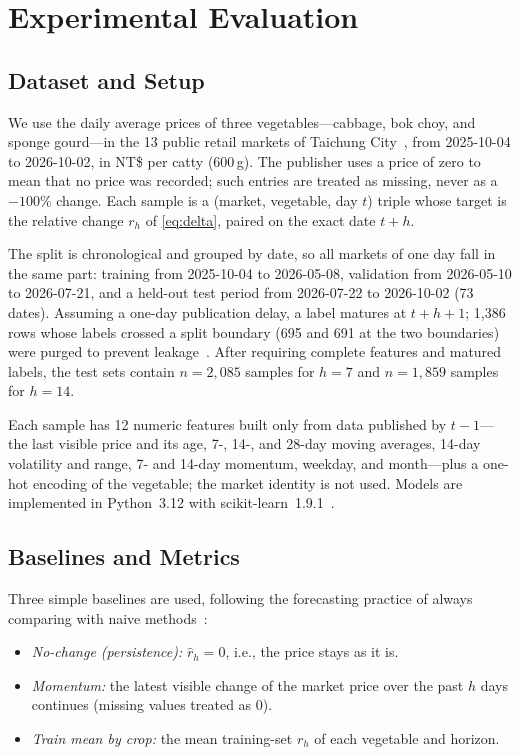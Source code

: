\section{Experimental Evaluation}\label{sec:experiments}

\subsection{Dataset and Setup}
We use the daily average prices of three vegetables---cabbage, bok choy, and
sponge gourd---in the 13 public retail markets of Taichung
City~\cite{taichung2026retail}, from 2025-10-04 to 2026-10-02, in NT\$ per
catty (600\,g). The publisher uses a price of zero to mean that no price was
recorded; such entries are treated as missing, never as a $-100\%$ change.
Each sample is a (market, vegetable, day $t$) triple whose target is the
relative change $r_h$ of \eqref{eq:delta}, paired on the exact date $t+h$.

The split is chronological and grouped by date, so all markets of one day fall
in the same part: training from 2025-10-04 to 2026-05-08, validation from
2026-05-10 to 2026-07-21, and a held-out test period from 2026-07-22 to
2026-10-02 (73 dates). Assuming a one-day publication delay, a label matures at
$t+h+1$; 1{,}386 rows whose labels crossed a split boundary (695 and 691 at the
two boundaries) were purged to prevent leakage~\cite{kaufman2012leakage}. After
requiring complete features and matured labels, the test sets contain
$n=2{,}085$ samples for $h=7$ and $n=1{,}859$ samples for $h=14$.

Each sample has 12 numeric features built only from data published by
$t-1$---the last visible price and its age, 7-, 14-, and 28-day moving
averages, 14-day volatility and range, 7- and 14-day momentum, weekday, and
month---plus a one-hot encoding of the vegetable; the market identity is not
used. Models are implemented in Python~3.12 with
scikit-learn~1.9.1~\cite{pedregosa2011scikit}.

\subsection{Baselines and Metrics}
Three simple baselines are used, following the forecasting practice of always
comparing with naive methods~\cite{makridakis2020m4}:
\begin{itemize}
\item \textit{No-change (persistence):} $\hat{r}_h=0$, i.e., the price stays
as it is.
\item \textit{Momentum:} the latest visible change of the market price over
the past $h$ days continues (missing values treated as $0$).
\item \textit{Train mean by crop:} the mean training-set $r_h$ of each
vegetable and horizon.
\end{itemize}

